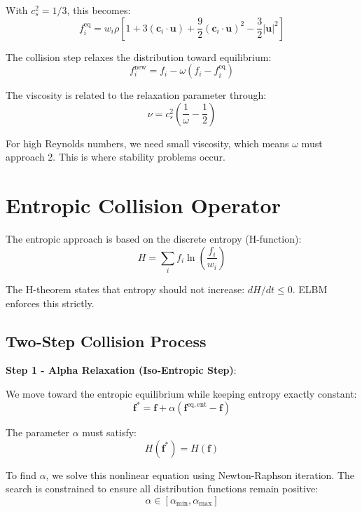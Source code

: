 With $c_s^2 = 1/3$, this becomes:
\begin{equation}
f_i^{\mathrm{eq}} = w_i \rho \left[1 + 3(\mathbf{c}_i \cdot \mathbf{u}) + \frac{9}{2}(\mathbf{c}_i \cdot \mathbf{u})^2 - \frac{3}{2}|\mathbf{u}|^2\right]
\end{equation}

The collision step relaxes the distribution toward equilibrium:
\begin{equation}
f_i^{\mathrm{new}} = f_i - \omega(f_i - f_i^{\mathrm{eq}})
\end{equation}

The viscosity is related to the relaxation parameter through:
\begin{equation}
\nu = c_s^2\left(\frac{1}{\omega} - \frac{1}{2}\right)
\end{equation}

For high Reynolds numbers, we need small viscosity, which means $\omega$ must approach 2. This is where stability problems occur.

\section{Entropic Collision Operator}

The entropic approach is based on the discrete entropy (H-function):
\begin{equation}
H = \sum_{i} f_i \ln\left(\frac{f_i}{w_i}\right)
\end{equation}

The H-theorem states that entropy should not increase: $dH/dt \leq 0$. ELBM enforces this strictly.

\subsection{Two-Step Collision Process}

\textbf{Step 1 - Alpha Relaxation (Iso-Entropic Step)}:

We move toward the entropic equilibrium while keeping entropy exactly constant:
\begin{equation}
\mathbf{f}^* = \mathbf{f} + \alpha(\mathbf{f}^{\mathrm{eq,ent}} - \mathbf{f})
\end{equation}

The parameter $\alpha$ must satisfy:
\begin{equation}
H(\mathbf{f}^*) = H(\mathbf{f})
\end{equation}

To find $\alpha$, we solve this nonlinear equation using Newton-Raphson iteration. The search is constrained to ensure all distribution functions remain positive:
\begin{equation}
\alpha \in [\alpha_{\min}, \alpha_{\max}]
\end{equation}

